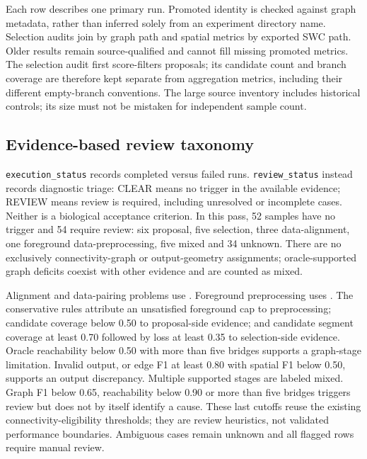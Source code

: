 \documentclass[11pt]{article}
\begin{document}
Each row describes one primary run. Promoted identity is checked against graph
metadata, rather than inferred solely from an experiment directory name.
Selection audits join by graph path and spatial metrics by exported SWC path.
Older results remain source-qualified and cannot fill missing promoted metrics.
The selection audit first score-filters proposals; its candidate count and
branch coverage are therefore kept separate from aggregation metrics, including
their different empty-branch conventions. The large source inventory includes
historical controls; its size must not be mistaken for independent sample count.

\subsection{Evidence-based review taxonomy}

\texttt{execution\_status} records completed versus failed runs.
\texttt{review\_status} instead records diagnostic triage: CLEAR means no trigger in
the available evidence; REVIEW means review is required, including unresolved or
incomplete cases. Neither is a biological acceptance criterion. In this pass,
52 samples have no trigger and 54 require review: six proposal, five selection,
three data-alignment, one foreground data-preprocessing, five mixed and 34 unknown. There are no exclusively
connectivity-graph or output-geometry assignments; oracle-supported graph
deficits coexist with other evidence and are counted as mixed.

Alignment and data-pairing problems use .
Foreground preprocessing uses .
The conservative rules attribute an unsatisfied foreground cap to preprocessing;
candidate coverage below 0.50 to proposal-side evidence; and candidate segment
coverage at least 0.70 followed by loss at least 0.35 to selection-side evidence.
Oracle reachability below 0.50 with more than five bridges supports a graph-stage
limitation. Invalid output, or edge F1 at least 0.80 with spatial F1 below 0.50,
supports an output discrepancy. Multiple supported stages are labeled mixed.
Graph F1 below 0.65, reachability below 0.90 or more than five bridges triggers
review but does not by itself identify a cause. These last cutoffs reuse the
existing connectivity-eligibility thresholds; they are review heuristics, not
validated performance boundaries. Ambiguous cases remain unknown and all
flagged rows require manual review.
\end{document}
